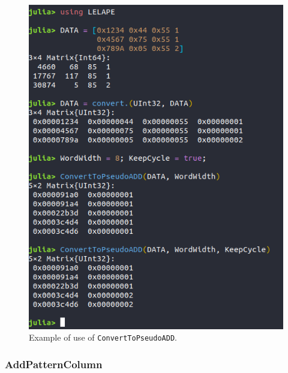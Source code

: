 \begin{itemize}
 	\begin{figure}[h!]
 		\centering
 		\includegraphics[width=0.65\columnwidth]{fig/functions/ConvertToPsudoADD.png}
 		\caption{Example of use of \texttt{ConvertToPseudoADD}.}
 		\label{fig:Example_ConvertToPseudoADD}
 	\end{figure}
 \end{itemize}
%
 \subsubsection*{AddPatternColumn}\label{Func:AddPatternColumn}
 
